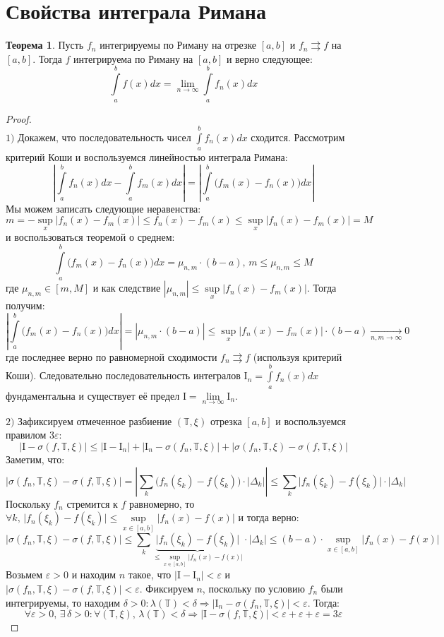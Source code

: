 \documentclass[12pt]{article}
\newcommand{\RN}[1]{%
	\textup{\uppercase\expandafter{\romannumeral#1}}%
}
\newcommand{\MTB}{\mathbb{T}}
\newcommand{\MI}{\mathrm{I}}
\newcommand{\VE}{\varepsilon}
\theoremstyle{definition}
\newtheorem{theorem}{Теорема}
\newcommand{\ddint}[2]{\displaystyle\int\limits_{#1}^{#2}}
\begin{document}
\lhead{Математический анализ - \RN{2}}
\section*{Свойства интеграла Римана}
\begin{theorem}
	Пусть $f_n$ интегрируемы по Риману на отрезке $[a,b]$ и $f_n \rightrightarrows f$ на $[a,b]$. Тогда $f$ интегрируема по Риману на $[a,b]$ и верно следующее:
	$$
		\ddint{a}{b}f(x)dx = \lim\limits_{n \to \infty} \ddint{a}{b}f_n(x)dx
	$$
\end{theorem}
\begin{proof}\hfill\\
	$1)$ Докажем, что последовательность чисел $\ddint{a}{b}f_n(x)dx$ сходится. Рассмотрим критерий Коши и воспользуемся линейностью интеграла Римана:
	$$
		\left| \ddint{a}{b}f_n(x)dx - \ddint{a}{b}f_m(x)dx \right| = \left| \ddint{a}{b}\big(f_m(x) - f_n(x)\big)dx \right|
	$$
	Мы можем записать следующие неравенства:
	$$
		m = -\sup\limits_x{|f_n(x) - f_m(x)|} \leq f_n(x) - f_m(x) \leq \sup\limits_x{|f_n(x) - f_m(x)|} = M \
	$$
	и воспользоваться теоремой о среднем:
	$$
		\ddint{a}{b}\big(f_m(x) - f_n(x)\big)dx = \mu_{n,m}{\cdot}(b-a), \, m \leq \mu_{n,m} \leq M	
	$$
	где $\mu_{n,m} \in [m,M]$ и как следствие $|\mu_{n,m}| \leq \sup\limits_x{|f_n(x) - f_m(x)|}$. Тогда получим:
	$$
		\left| \ddint{a}{b}\big(f_m(x) - f_n(x)\big)dx \right| = \left|  \mu_{n,m}{\cdot}(b-a)  \right| \leq \sup\limits_x{|f_n(x) - f_m(x)|}{\cdot}(b-a) \xrightarrow[n,m\to \infty]{} 0
	$$
	где последнее верно по равномерной сходимости $f_n \rightrightarrows f$ (используя критерий Коши). Следовательно последовательность интегралов $\MI_n = \ddint{a}{b}f_n(x)dx$ фундаментальна и существует её предел $\MI = \lim\limits_{n\to \infty} \MI_n$.
	
	$2)$ Зафиксируем отмеченное разбиение $(\MTB,\xi)$ отрезка $[a,b]$ и воспользуемся правилом $3\VE$:
	$$
		|\MI - \sigma(f,\MTB,\xi)| \leq |\MI - \MI_n| + |\MI_n - \sigma(f_n,\MTB,\xi)| + |\sigma(f_n,\MTB,\xi) - \sigma(f,\MTB,\xi)| 
	$$
	Заметим, что:
	$$
		|\sigma(f_n,\MTB,\xi) - \sigma(f,\MTB,\xi)| = \left| \displaystyle \sum\limits_k \big(f_n(\xi_k) - f(\xi_k)\big){\cdot}|\Delta_k| \right| \leq \displaystyle \sum\limits_k \big|f_n(\xi_k) - f(\xi_k)\big|{\cdot}|\Delta_k|
	$$
	Поскольку $f_n$ стремится к $f$ равномерно, то $\forall k, \, \big|f_n(\xi_k) - f(\xi_k)\big| \leq \sup\limits_{x \in [a,b]}\big|f_n(x) - f(x)\big|$ и тогда верно:
	$$
		|\sigma(f_n,\MTB,\xi) - \sigma(f,\MTB,\xi)| \leq \displaystyle \sum\limits_k \underbrace{\big|f_n(\xi_k) - f(\xi_k)\big|}_{\leq \sup\limits_{x\in[a,b]}\big|f_n(x) - f(x)\big|}{\cdot}|\Delta_k| \leq (b-a){\cdot}\sup\limits_{x \in [a,b]}\big|f_n(x) - f(x)\big|
	$$
	Возьмем $\VE > 0$ и находим $n$ такое, что $|\MI - \MI_n| < \VE$ и $|\sigma(f_n,\MTB,\xi) - \sigma(f,\MTB,\xi)| < \VE$. Фиксируем $n$, поскольку по условию $f_n$ были интегрируемы, то находим $\delta > 0 \colon \lambda(\MTB) < \delta \Rightarrow |\MI_n - \sigma(f_n,\MTB,\xi)| < \VE$. Тогда:
	$$
		\forall \VE > 0, \, \exists \, \delta > 0 \colon \forall (\MTB, \xi), \, \lambda(\MTB) < \delta \Rightarrow |\MI - \sigma(f,\MTB,\xi)| < \VE + \VE + \VE = 3\VE
	$$
\end{proof}
\end{document}
